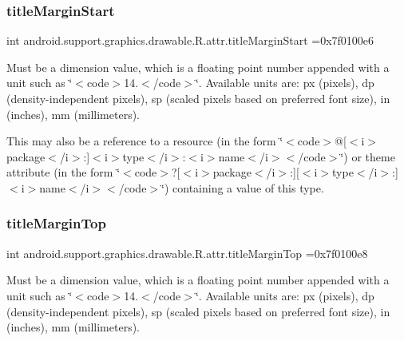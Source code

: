 \subsubsection{\texorpdfstring{title\+Margin\+Start}{titleMarginStart}}
{\footnotesize\ttfamily int android.\+support.\+graphics.\+drawable.\+R.\+attr.\+title\+Margin\+Start =0x7f0100e6\hspace{0.3cm}{\ttfamily [static]}}

Must be a dimension value, which is a floating point number appended with a unit such as \char`\"{}$<$code$>$14.\+5sp$<$/code$>$\char`\"{}. Available units are\+: px (pixels), dp (density-\/independent pixels), sp (scaled pixels based on preferred font size), in (inches), mm (millimeters). 

This may also be a reference to a resource (in the form \char`\"{}$<$code$>$@\mbox{[}$<$i$>$package$<$/i$>$\+:\mbox{]}$<$i$>$type$<$/i$>$\+:$<$i$>$name$<$/i$>$$<$/code$>$\char`\"{}) or theme attribute (in the form \char`\"{}$<$code$>$?\mbox{[}$<$i$>$package$<$/i$>$\+:\mbox{]}\mbox{[}$<$i$>$type$<$/i$>$\+:\mbox{]}$<$i$>$name$<$/i$>$$<$/code$>$\char`\"{}) containing a value of this type. \mbox{\label{classandroid_1_1support_1_1graphics_1_1drawable_1_1R_1_1attr_aba4e0b8f7488530bb023d20d115fd3fa}} 
\subsubsection{\texorpdfstring{title\+Margin\+Top}{titleMarginTop}}
{\footnotesize\ttfamily int android.\+support.\+graphics.\+drawable.\+R.\+attr.\+title\+Margin\+Top =0x7f0100e8\hspace{0.3cm}{\ttfamily [static]}}

Must be a dimension value, which is a floating point number appended with a unit such as \char`\"{}$<$code$>$14.\+5sp$<$/code$>$\char`\"{}. Available units are\+: px (pixels), dp (density-\/independent pixels), sp (scaled pixels based on preferred font size), in (inches), mm (millimeters). 

